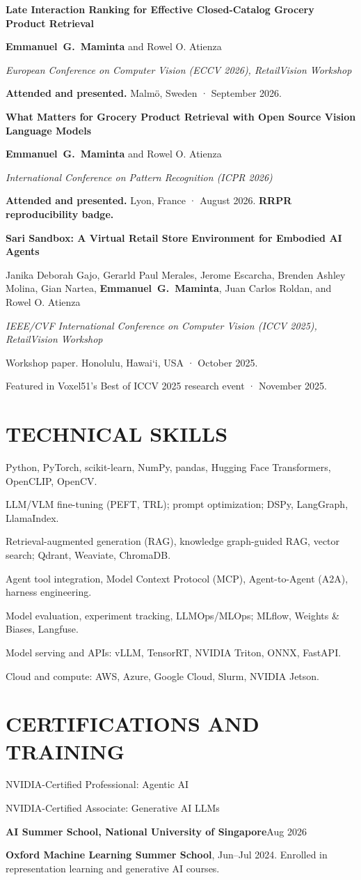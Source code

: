 \documentclass[11pt,a4paper]{article}
\newcommand{\dated}[2]{\textbf{#1}\hfill #2\par}
\newcommand{\paper}[4]{%
  \Needspace{6\baselineskip}%
  \textbf{#1}\par
  #2\par
  \textit{#3}\par
  #4\par\vspace{8pt}}
\newcommand{\me}{\mbox{\textbf{Emmanuel G. Maminta}}}
\begin{document}
\paper{Late Interaction Ranking for Effective Closed-Catalog Grocery Product Retrieval}
{\me{} and Rowel O. Atienza}
{European Conference on Computer Vision (ECCV 2026), RetailVision Workshop}
{\textbf{Attended and presented.} Malmö, Sweden · September 2026.}

\paper{What Matters for Grocery Product Retrieval with Open Source Vision Language Models}
{\me{} and Rowel O. Atienza}
{International Conference on Pattern Recognition (ICPR 2026)}
{\textbf{Attended and presented.} Lyon, France · August 2026. \textbf{RRPR reproducibility badge.}}

\paper{Sari Sandbox: A Virtual Retail Store Environment for Embodied AI Agents}
{Janika Deborah Gajo, Gerarld Paul Merales, Jerome Escarcha, Brenden Ashley Molina, Gian Nartea, \me, Juan Carlos Roldan, and Rowel O. Atienza}
{IEEE/CVF International Conference on Computer Vision (ICCV 2025), RetailVision Workshop}
{Workshop paper. Honolulu, Hawai‘i, USA · October 2025.\par
Featured in Voxel51’s Best of ICCV 2025 research event · November 2025.}
\vspace{-8pt}

\section{TECHNICAL SKILLS}
Python, PyTorch, scikit-learn, NumPy, pandas, Hugging Face Transformers, OpenCLIP, OpenCV.\par
LLM/VLM fine-tuning (PEFT, TRL); prompt optimization; DSPy, LangGraph, LlamaIndex.\par
Retrieval-augmented generation (RAG), knowledge graph-guided RAG, vector search; Qdrant, Weaviate, ChromaDB.\par
Agent tool integration, Model Context Protocol (MCP), Agent-to-Agent (A2A), harness engineering.\par
Model evaluation, experiment tracking, LLMOps/MLOps; MLflow, Weights \& Biases, Langfuse.\par
Model serving and APIs: vLLM, TensorRT, NVIDIA Triton, ONNX, FastAPI.\par
Cloud and compute: AWS, Azure, Google Cloud, Slurm, NVIDIA Jetson.\par

\section{CERTIFICATIONS AND TRAINING}
NVIDIA-Certified Professional: Agentic AI\par
NVIDIA-Certified Associate: Generative AI LLMs\par
\vspace{3pt}
\dated{AI Summer School, National University of Singapore}{Aug 2026}
\textbf{Oxford Machine Learning Summer School}, Jun–Jul 2024. Enrolled in representation learning and generative AI courses.\par
\end{document}
